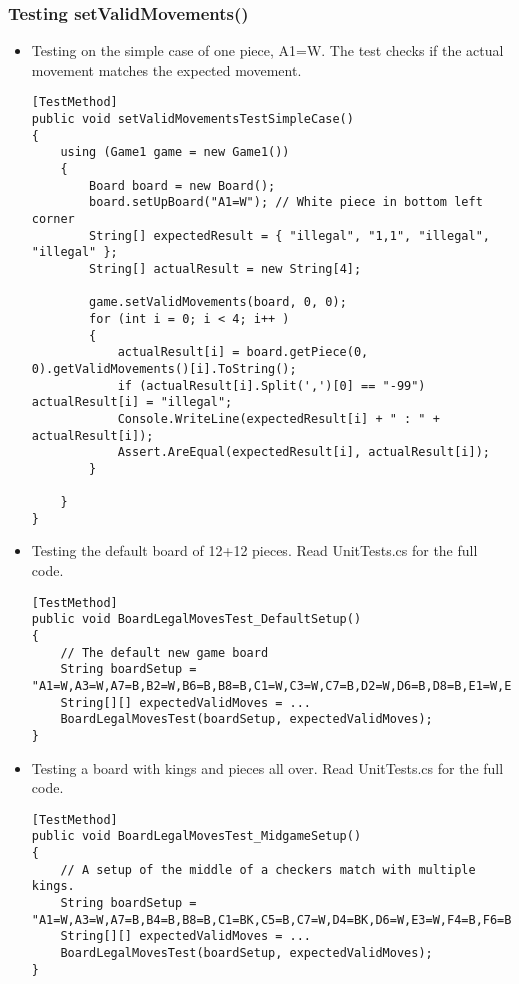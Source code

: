 \documentclass{article}
\begin{document}
\subsubsection*{Testing setValidMovements()}

\begin{itemize}
\item Testing on the simple case of one piece, A1=W. The test checks if the actual movement matches the expected movement. \hfill
\begin{lstlisting}[style=CustomCSharpStyle, firstnumber=48]
[TestMethod]
public void setValidMovementsTestSimpleCase()
{
    using (Game1 game = new Game1())
    {
        Board board = new Board();
        board.setUpBoard("A1=W"); // White piece in bottom left corner
        String[] expectedResult = { "illegal", "1,1", "illegal", "illegal" };
        String[] actualResult = new String[4];

        game.setValidMovements(board, 0, 0);
        for (int i = 0; i < 4; i++ )
        {
            actualResult[i] = board.getPiece(0, 0).getValidMovements()[i].ToString();
            if (actualResult[i].Split(',')[0] == "-99") actualResult[i] = "illegal";
            Console.WriteLine(expectedResult[i] + " : " + actualResult[i]);
            Assert.AreEqual(expectedResult[i], actualResult[i]);
        }
        
    }
}
\end{lstlisting}

\item Testing the default board of 12+12 pieces. Read UnitTests.cs for the full code. \hfill
\begin{lstlisting}[style=CustomCSharpStyle, firstnumber=70]
[TestMethod]
public void BoardLegalMovesTest_DefaultSetup()
{
    // The default new game board
    String boardSetup = "A1=W,A3=W,A7=B,B2=W,B6=B,B8=B,C1=W,C3=W,C7=B,D2=W,D6=B,D8=B,E1=W,E3=W,E7=B,F2=W,F6=B,F8=B,G1=W,G3=W,G7=B,H2=W,H6=B,H8=B";
    String[][] expectedValidMoves = ...
    BoardLegalMovesTest(boardSetup, expectedValidMoves);
}
\end{lstlisting}

\item Testing a board with kings and pieces all over. Read UnitTests.cs for the full code. \hfill
\begin{lstlisting}[style=CustomCSharpStyle, firstnumber=80]
[TestMethod]
public void BoardLegalMovesTest_MidgameSetup()
{
    // A setup of the middle of a checkers match with multiple kings.
    String boardSetup = "A1=W,A3=W,A7=B,B4=B,B8=B,C1=BK,C5=B,C7=W,D4=BK,D6=W,E3=W,F4=B,F6=B,F8=WK,G1=W,G3=W,G5=W,G7=WK,H6=B";
    String[][] expectedValidMoves = ...
    BoardLegalMovesTest(boardSetup, expectedValidMoves);
}
\end{lstlisting}
\end{itemize}
\end{document}
